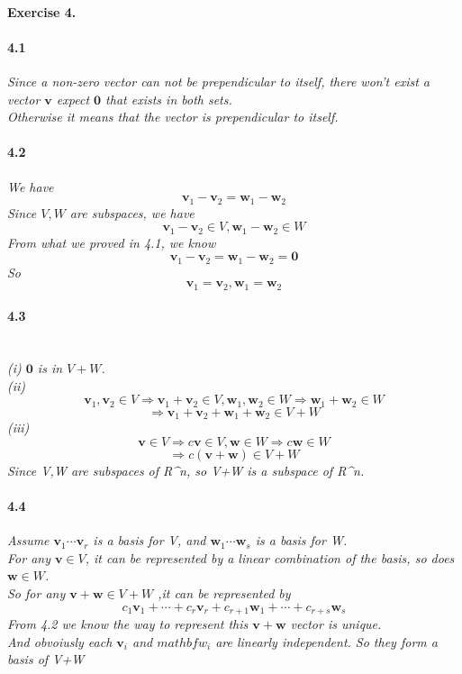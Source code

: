 \documentclass{article}
\begin{document}
\paragraph{Exercise 4.}
  \paragraph{4.1}
  \textit{
    Since a non-zero vector can not be prependicular to itself, there won't exist a vector $\mathbf{v}$ expect $\mathbf{0}$ that exists in both sets.\\
    Otherwise it means that the vector is prependicular to itself.
  }
  \paragraph{4.2}
  \textit{
    We have 
    \[
    \mathbf{v}_1-\mathbf{v}_2=\mathbf{w}_1-\mathbf{w}_2
    \]
    Since $V,W$ are subspaces, we have 
    \[
        \mathbf{v}_1-\mathbf{v}_2 \in V , \mathbf{w}_1-\mathbf{w}_2 \in W
    \]
    From what we proved in 4.1, we know
    \[
        \mathbf{v}_1-\mathbf{v}_2=\mathbf{w}_1-\mathbf{w}_2=\mathbf{0}
    \]
    So 
    \[
        \mathbf{v}_1=\mathbf{v}_2 , \mathbf{w}_1=\mathbf{w}_2
    \]
  }
  \paragraph{4.3}\\
  \textit{
    (i) $\mathbf{0}$ is in $V+W$.\\
    (ii) \[
    \mathbf{v}_1,\mathbf{v}_2 \in V \Rightarrow \mathbf{v}_1+\mathbf{v}_2 \in V , \mathbf{w}_1,\mathbf{w}_2 \in W \Rightarrow \mathbf{w}_1+\mathbf{w}_2 \in W 
    \]
    \[
      \Rightarrow \mathbf{v}_1+\mathbf{v}_2+\mathbf{w}_1+\mathbf{w}_2 \in V+W
    \]
    (iii) \[
    \mathbf{v} \in V \Rightarrow c\mathbf{v} \in V , \mathbf{w} \in W \Rightarrow c\mathbf{w} \in W
    \]
    \[
    \Rightarrow c(\mathbf{v}+\mathbf{w}) \in V+W
    \]
    Since V,W are subspaces of R^n, so V+W is a subspace of R^n.
  }
  \paragraph{4.4}
  \textit{
    Assume $\mathbf{v}_1 \cdots \mathbf{v}_r$ is a basis for V, and $\mathbf{w}_1 \cdots \mathbf{w}_s$ is a basis for W.\\
    For any $ \mathbf{v} \in V$, it can be represented by a linear combination of the basis, so does $ \mathbf{w} \in W$.\\
    So for any $\mathbf{v}+\mathbf{w} \in V+W $ ,it can be represented by
    \[
    c_1\mathbf{v}_1 + \cdots + c_r\mathbf{v}_r +c_{r+1}\mathbf{w}_1 + \cdots + c_{r+s} \mathbf{w}_s
    \] 
    From 4.2 we know the way to represent this $\mathbf{v}+\mathbf{w}$ vector is unique. \\
    And obvoiusly each $\mathbf{v}_i$ and $mathbf{w}_i$ are linearly independent. So they form a basis of V+W
  }
\end{document}
